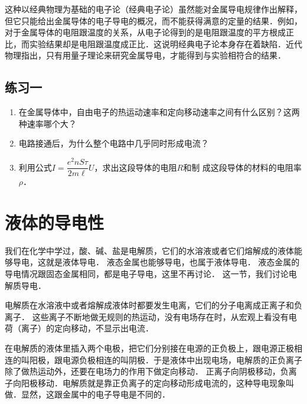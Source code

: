 这种以经典物理为基础的电子论（经典电子论）虽然能对金属导电规律作出解释，但它只能给出金属导体的电子导电的概况，而不能获得满意的定量的结果．例如，对于金属导体的电阻跟温度的关系，从电子论得到的是电阻跟温度的平方根成正比，而实验结果却是电阻跟温度成正比．这说明经典电子论本身存在着缺陷．近代物理指出，只有用量子理论来研究金属导电，才能得到与实验相符合的结果．

\subsection*{练习一}
\begin{enumerate}
    \item 在金属导体中，自由电子的热运动速率和定向移动速率之间有什么区别？这两种速率哪个大？
    \item 电路接通后，为什么整个电路中几乎同时形成电流？
    \item 利用公式$I=\dfrac{e^2 nS\tau}{2m\ell}U$，求出这段导体的电阻$R$和制
成这段导体的材料的电阻率$\rho$．
\end{enumerate}


\section{液体的导电性}
我们在化学中学过，酸、碱、盐是电解质，它们的水溶液或者它们熔解成的液体能够导电，这就是液体导电．
液态金属也能够导电，也属于液体导电．
液态金属的导电情况跟固态金属相同，都是电子导电，这里不再讨论．
这一节，我们讨论电解质导电．

电解质在水溶液中或者熔解成液体时都要发生电离，它们的分子电离成正离子和负离子．
这些离子不断地做无规则的热运动，没有电场存在时，从宏观上看没有电荷（离子）的定向移动，不显示出电流．

在电解质的液体里插入两个电极，把它们分别接在电源的正负极上，跟电源正极相连的叫阳极，跟电源负极相连的叫阴极．于是液体中出现电场，电解质的正负离子除了做热运动外，还要在电场力的作用下做定向移动．
正离子向阴极移动，负离子向阳极移动．电解质就是靠正负离子的定向移动形成电流的，这种导电现象叫做．显然，这跟金属中的电子导电是不同的．

